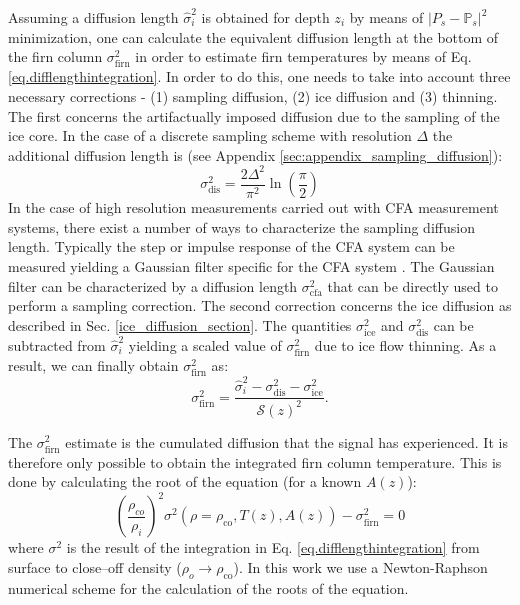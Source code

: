 \documentclass[11pt, draftcls, onecolumn]{IEEEtran} %
\numberwithin{equation}{section}
\numberwithin{table}{section}
\numberwithin{figure}{section}
\begin{document}
Assuming a diffusion length $\widehat{\sigma}_i^2$ is obtained for depth $z_i$ by means of 
$\vert P_s - \mathbb{P}_s \vert^2$ minimization, one can calculate the equivalent diffusion 
length at the bottom of the firn column $\sigma^2_{\mathrm{firn}}$ in order to estimate firn temperatures
by means of Eq. \ref{eq.difflengthintegration}. 
In order to do this, one needs to take into account three necessary corrections
- (1) sampling diffusion, (2) ice diffusion and (3) thinning. 
The first concerns the artifactually imposed
diffusion due to the sampling of the ice core. 
In the case of a discrete sampling scheme with resolution $\Delta$ the additional 
diffusion length is (see Appendix \ref{sec:appendix_sampling_diffusion}): 
\begin{equation}
\sigma^2_{\mathrm{dis}} = \frac{2\Delta^2}{\pi^2}\ln{\left(\frac{\pi}{2}\right)}
\label{sampling_sigma}
\end{equation}
In the case of high resolution measurements carried out with CFA measurement systems, there
exist a number of ways to characterize the sampling diffusion length. 
Typically the step or impulse response of the CFA system can be measured yielding a Gaussian 
filter specific for the CFA system \citep{Gkinis2011, Emanuelsson2015, Jones2017a}. 
The Gaussian filter can be characterized by a diffusion 
length $\sigma^2_{\mathrm{cfa}}$ that can be directly used to perform a sampling correction.
The second correction concerns the ice diffusion as described in Sec. \ref{ice_diffusion_section}.
The quantities $\sigma^2_{\mathrm{ice}}$ and $\sigma^2_{\mathrm{dis}}$ can be subtracted from 
$\widehat{\sigma}_i^2$ yielding a scaled value   of $\sigma^2_{\mathrm{firn}}$ due to ice flow thinning.
As a result,  we can finally obtain $\sigma^2_{\mathrm{firn}}$ as:
\begin{equation} 
\sigma^2_\text{firn} = \frac{\widehat{\sigma}_i^2 - \sigma^2_\text{dis} - \sigma^2_\text{ice}}{{\mathcal{S}(z)}^{2}}.
\label{eq.firn_data}
\end{equation}

The $\sigma^2_{\mathrm{firn}}$ estimate is the cumulated diffusion that the signal has experienced. 
It is therefore only possible to obtain the integrated firn column temperature. 
This is done by calculating the root of the equation (for a known $A(z)$):
\begin{equation}
\label{eq:T_reconstruction}
\left(\frac{\rho_{co}}{\rho_i} \right)^2  \sigma^2(\rho = \rho_{\mathrm{co}},T(z), A(z)) - \sigma^2_\text{firn} = 0 
\end{equation}
where $\sigma^2$ is the result of the integration in Eq. \ref{eq.difflengthintegration} from surface to 
close--off density ($\rho_o  \rightarrow \rho_{\mathrm{co}}$). In this work we use a Newton-Raphson numerical scheme 
\citep{RECIPES} for the calculation of the roots of the equation.
\end{document}
